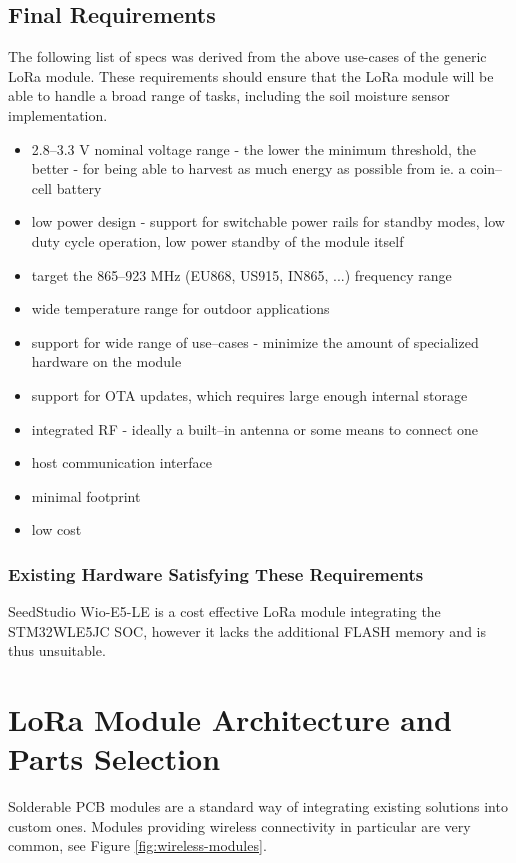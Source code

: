 \subsection{\label{section:final-requirements}Final Requirements}
The following list of specs was derived from the above use-cases of the generic LoRa module. These requirements should ensure that the LoRa module will be able to handle a broad range of tasks, including the soil moisture sensor implementation.
\begin{itemize}
    \item 2.8--3.3 V nominal voltage range - the lower the minimum threshold, the better - for being able to harvest as much energy as possible from ie. a coin--cell battery
    \item low power design - support for switchable power rails for standby modes, low duty cycle operation, low power standby of the module itself
    \item target the 865--923 MHz (EU868, US915, IN865, ...) frequency range
    \item wide temperature range for outdoor applications
    \item support for wide range of use--cases - minimize the amount of specialized hardware on the module
    \item support for OTA updates, which requires large enough internal storage
    \item integrated RF - ideally a built--in antenna or some means to connect one
    \item host communication interface
    \item minimal footprint
    \item low cost
\end{itemize}

\subsubsection{Existing Hardware Satisfying These Requirements}
SeedStudio Wio-E5-LE \cite{stmicroelectronics_lora_2024, seeedstudio_wio-e5-wireless_2024} is a cost effective LoRa module integrating the STM32WLE5JC SOC, however it lacks the additional FLASH memory and is thus unsuitable.

\section{\label{section:module-architecture}LoRa Module Architecture and Parts Selection}
Solderable PCB modules are a standard way of integrating existing solutions into custom ones. Modules providing wireless connectivity in particular are very common, see Figure \ref{fig:wireless-modules}.

